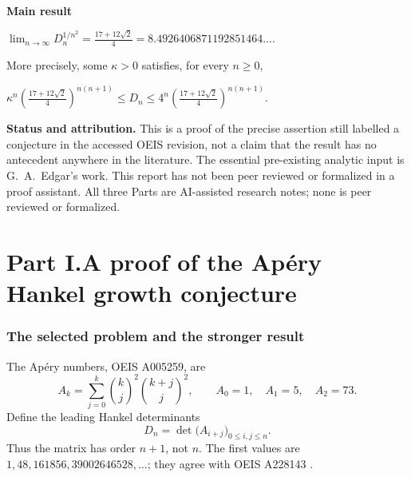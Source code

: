 \documentclass[11pt,a4paper]{article}
\numberwithin{equation}{section}
\theoremstyle{remark}\newtheorem{remark}[theorem]{Remark}
\begin{document}
\begin{resultbox}
\centering
\textbf{Main result}\par\medskip
$\displaystyle
\lim_{n\to\infty}D_n^{1/n^2}
=\frac{17+12\sqrt2}{4}
=8.4926406871192851464\ldots.$\par\medskip
More precisely, some $\kappa>0$ satisfies, for every $n\geq0$,\par\smallskip
$\displaystyle
\kappa^n\left(\frac{17+12\sqrt2}{4}\right)^{n(n+1)}
\leq D_n\leq
4^n\left(\frac{17+12\sqrt2}{4}\right)^{n(n+1)}.$
\end{resultbox}

\noindent\textbf{Status and attribution.}
This is a proof of the precise assertion still labelled a conjecture in the
accessed OEIS revision, not a claim that the result has no antecedent anywhere
in the literature. The essential pre-existing analytic input is G.~A.~Edgar's
work. This report has not been peer reviewed or formalized in a proof assistant.
All three Parts are AI-assisted research notes; none is peer reviewed or
formalized.

\newpage
\tableofcontents
\clearpage
\part*{Part I.\quad A proof of the Ap\'ery Hankel growth conjecture}
\section{The selected problem and the stronger result}
The Ap\'ery numbers, OEIS A005259, are
\begin{equation}\label{eq:apery}
 A_k=\sum_{j=0}^{k}\binom{k}{j}^{\!2}\binom{k+j}{j}^{\!2},
 \qquad A_0=1,\quad A_1=5,\quad A_2=73.
\end{equation}
Define the leading Hankel determinants
\begin{equation}\label{eq:det}
 D_n=\det\bigl(A_{i+j}\bigr)_{0\leq i,j\leq n}.
\end{equation}
Thus the matrix has order $n+1$, not $n$. The first values are
$1,48,161856,39002646528,\ldots$; they agree with OEIS A228143
\cite{oeis-apery,oeis-hankel}.
\end{document}

